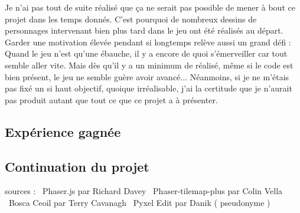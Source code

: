 \documentclass[11pt]{article}
\begin{document}
Je n'ai pas tout de suite réalisé que ça ne serait pas possible de mener à bout ce projet dans les temps donnés. C'est pourquoi de nombreux dessins de personnages intervenant bien plus tard dans le jeu ont été réalisés au départ. Garder une motivation élevée pendant si longtemps relève aussi un grand défi : Quand le jeu n'est qu'une ébauche, il y a encore de quoi s'émerveiller car tout semble aller vite. Mais dès qu'il y a un minimum de réalisé, même si le code est bien présent, le jeu ne semble guère avoir avancé... Néanmoins, si je ne m'étais pas fixé un si haut objectif, quoique irréalisable, j'ai la certitude que je n'aurait pas produit autant que tout ce que ce projet a à présenter.
\subsection{Expérience gagnée}
\subsection{Continuation du projet}


\newpage
{}
\begin{thebibliography}{9}
sources : \
Phaser.js par Richard Davey \
Phaser-tilemap-plus par Colin Vella \
Bosca Ceoil par Terry Cavanagh \
Pyxel Edit par Danik ( pseudonyme )\
\end{thebibliography}
\end{document}
